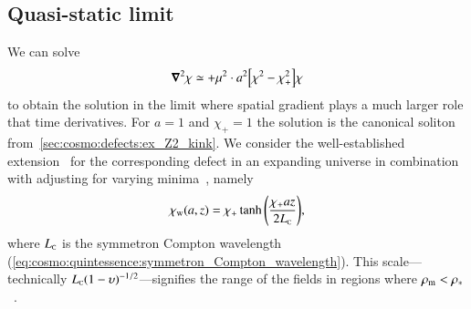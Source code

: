 
\subsection{Quasi-static limit}\label{sec:PT:symm_dws:quasi-static}
    We can solve
    \begin{equation}\label{eq:PT:symm_dws:eom_chi_quasistatic}
        \boldsymbol{\nabla}^2 \chi \simeq  +\mu^2 
         \cdot a^2{\left[  \chi^2 - \chi_+^2  \right]}\chi
    \end{equation}
    to obtain the solution in the limit where spatial gradient plays a much larger role that time derivatives. For $a=1$ and $\chi_+=1$ the solution is the canonical soliton from~\cref{sec:cosmo:defects:ex_Z2_kink}. 
    We consider the well-established extension~\citep[see e.g.][]{pressDynamicalEvolutionDomain1989} for the corresponding defect in an expanding universe in combination with adjusting for varying minima~\citep{llinaresDomainWallsCoupled2014}, namely
    \begin{equation}\label{eq:PT:symm_dws:chi_w_quasistatic_FLRW} 
        \chi_\mathrm{w}(a, z) = \chi_+ \tanh{{\left(  \frac{ \chi_+ az}{2L_{\text{\tiny{C}}}}   \right)}},
    \end{equation}
    where $L_{\text{\tiny{C}}}$ is the symmetron Compton wavelength (\cref{eq:cosmo:quintessence:symmetron_Compton_wavelength}). This scale---technically $L_{\text{\tiny{C}}}(1-\upsilon)^{-1/2}$---signifies the range of the fields in regions where $\rho_\mathrm{m} < \rho_\ast$~\citep{perivolaropoulosGravitationalTransitionsExplicitly2022}.

